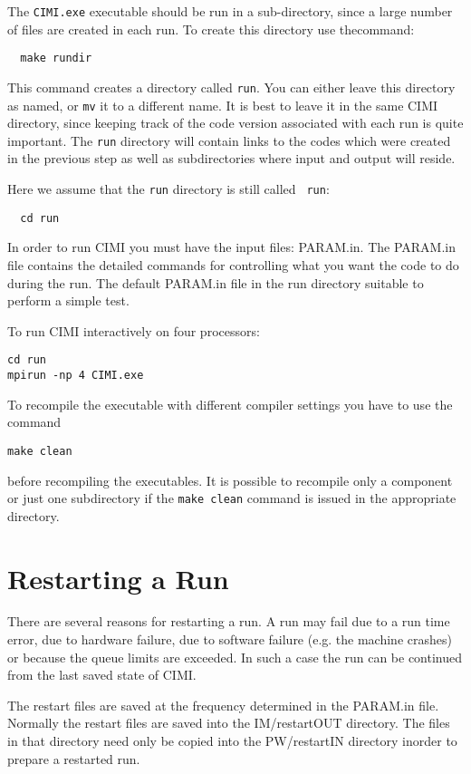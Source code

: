 The {\tt CIMI.exe} executable should be run in a sub-directory, since a 
large number of files are created in each run.  
To create this directory use thecommand:
\begin{verbatim}
  make rundir
\end{verbatim} 
This command creates a directory called {\tt run}.  You can either
leave this directory as named, or {\tt mv} it to a different name.  It
is best to leave it in the same CIMI directory, since
keeping track of the code version associated with each run is quite
important.  The {\tt run} directory will contain links to the codes
which were created in the previous step as well as subdirectories
where input and output will reside.

Here we assume that the {\tt run} directory is still called {\tt
run}:
\begin{verbatim}
  cd run
\end{verbatim}
In order to run CIMI you must have the input files: 
PARAM.in. The PARAM.in 
file contains the detailed commands for controlling what you want the
code to do during the run.  The default PARAM.in 
file in the run directory  suitable to perform a simple test.

To run CIMI interactively on four processors:
\begin{verbatim}
cd run
mpirun -np 4 CIMI.exe
\end{verbatim}

To recompile the executable with different compiler settings you have
to use the command
\begin{verbatim}
make clean
\end{verbatim}
before recompiling the executables. It is possible to recompile
only a component or just one subdirectory if the {\tt make clean}
command is issued in the appropriate directory.

\section{Restarting a Run}

There are several reasons for restarting a run. A run may fail
due to a run time error, due to hardware failure, due to 
software failure (e.g. the machine crashes) or because the
queue limits are exceeded. In such a case the run can be continued from
the last saved state of CIMI. 

The restart files are saved at the frequency determined in the PARAM.in file.
Normally the restart files are saved into the IM/restartOUT directory. 
The files in that directory need only be copied into the PW/restartIN 
directory inorder to prepare a restarted run.

